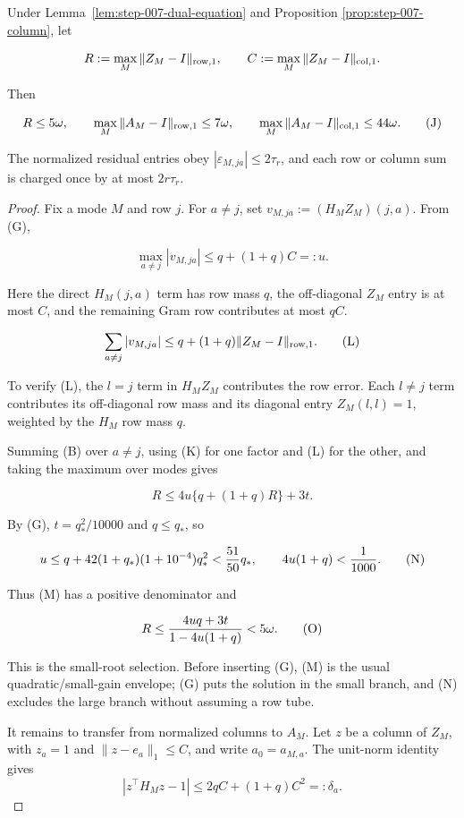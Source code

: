 \begin{proposition}\label{prop:step-007-row}

Under Lemma~\ref{lem:step-007-dual-equation} and Proposition
\ref{prop:step-007-column}, let

\[
R:=\max_M\|Z_M-I\|_{\rm row,1},\qquad
C:=\max_M\|Z_M-I\|_{\rm col,1}.
\]

Then

\[
R\le5\omega,\qquad
\max_M\|A_M-I\|_{\rm row,1}\le7\omega,\qquad
\max_M\|A_M-I\|_{\rm col,1}\le44\omega.
\tag{J}
\]

The normalized residual entries obey
$|\varepsilon_{M,ja}|\le2\tau_r$, and each row or column sum is charged once
by at most $2r\tau_r$.

\begin{proof}

Fix a mode $M$ and row $j$. For $a\ne j$, set
$v_{M,ja}:=(H_MZ_M)(j,a)$. From (G),

\[
\max_{a\ne j}|v_{M,ja}|\le q+(1+q)C=:u.
\tag{K}
\]

Here the direct $H_M(j,a)$ term has row mass $q$, the off-diagonal $Z_M$
entry is at most $C$, and the remaining Gram row contributes at most $qC$.

\[
\sum_{a\ne j}|v_{M,ja}|
\le q+(1+q)\|Z_M-I\|_{\rm row,1}.
\tag{L}
\]

To verify (L), the $l=j$ term in $H_MZ_M$ contributes the row error. Each
$l\ne j$ term contributes its off-diagonal row mass and its diagonal entry
$Z_M(l,l)=1$, weighted by the $H_M$ row mass $q$.

Summing (B) over $a\ne j$, using (K) for one factor and (L) for the other,
and taking the maximum over modes gives

\[
R\le4u\{q+(1+q)R\}+3t.
\tag{M}
\]

By (G), $t=q_*^2/10000$ and $q\le q_*$, so

\[
u\le q+42(1+q_*)(1+10^{-4})q_*^2<{51\over50}q_*,\qquad
4u(1+q)<{1\over1000}.
\tag{N}
\]

Thus (M) has a positive denominator and

\[
R\le{4uq+3t\over1-4u(1+q)}<5\omega.
\tag{O}
\]

This is the small-root selection.  Before inserting (G), (M) is the usual
quadratic/small-gain envelope; (G) puts the solution in the small branch,
and (N) excludes the large branch without assuming a row tube.

It remains to transfer from normalized columns to $A_M$. Let $z$ be a column
of $Z_M$, with $z_a=1$ and $\|z-e_a\|_1\le C$, and write $a_0=a_{M,a}$.
The unit-norm identity gives
\[
|z^\top H_Mz-1|\le2qC+(1+q)C^2=:\delta_a.
\tag{P}
\]


\end{proof}
\end{proposition}
